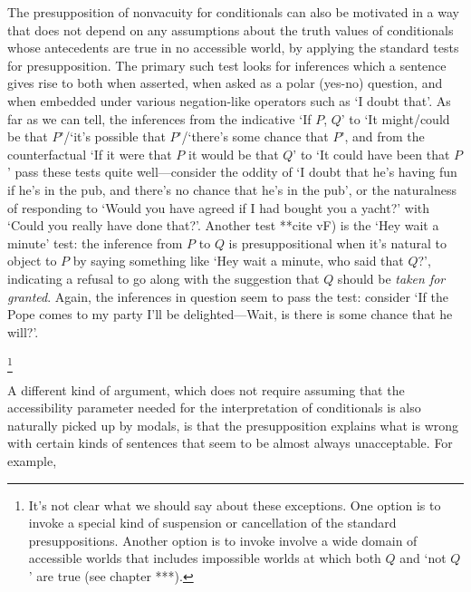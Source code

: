 \documentclass[If.tex]{subfiles}
\begin{document}
The presupposition of nonvacuity for conditionals can also be motivated in a way that does not depend on any assumptions about the truth values of conditionals whose antecedents are true in no accessible world, by applying the standard tests for presupposition.  The primary such test looks for inferences which a sentence gives rise to both when asserted, when asked as a polar (yes-no) question, and when embedded under various negation-like operators such as ‘I doubt that’.  As far as we can tell, the inferences from the indicative ‘If $P$, $Q$’ to ‘It might/could be that $P$’/‘it's possible that $P$’/‘there's some chance that $P$’, and from the counterfactual ‘If it were that $P$ it would be that $Q$’ to ‘It could have been that $P$’ pass these tests quite well---consider the oddity of ‘I doubt that he's having fun if he's in the pub, and there's no chance that he's in the pub’, or the naturalness of responding to ‘Would you have agreed if I had bought you a yacht?’ with ‘Could you really have done that?’.  Another test **cite vF) is the ‘Hey wait a minute’ test: the inference from $P$ to $Q$ is presuppositional when it's natural to object to $P$ by saying something like ‘Hey wait a minute, who said that $Q$?’, indicating a refusal to go along with the suggestion that $Q$ should be \emph{taken for granted}.  Again, the inferences in question seem to pass the test: consider ‘If the Pope comes to my party I'll be delighted---Wait, is there is some chance that he will?’.  



\footnote{It's not clear what we should say about these exceptions.  One option is to invoke a special kind of suspension or cancellation of the standard presuppositions.  Another option is to invoke involve a wide domain of accessible worlds that includes impossible worlds at which both $Q$ and ‘not $Q$’ are true (see chapter ***).} 


  

A different kind of argument, which does not require assuming that the accessibility parameter needed for the interpretation of conditionals is also naturally picked up by modals, is that the presupposition explains what is wrong with certain kinds of sentences that seem to be almost always unacceptable. For example, 

\end{document}

